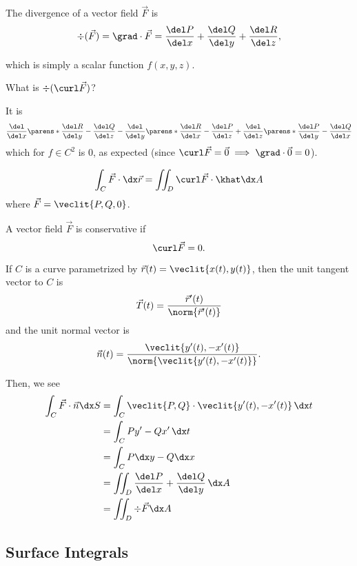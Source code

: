 \documentclass{article}
\begin{document}
\begin{defn}[Divergence]
  The divergence of a vector field $\vec{F}$ is
  \[ \div(\vec{F}) = \grad \cdot \vec{F} = \frac{\del P}{\del x} + \frac{\del Q}{\del y} + \frac{\del R}{\del z}, \]
\end{defn}
which is simply a scalar function $f(x, y, z)$.

\begin{ex}
  What is $\div(\curl \vec{F})$?

  It is
  \[
    \frac{\del}{\del x}\parens*{\frac{\del R}{\del y} - \frac{\del Q}{\del z}}
    - \frac{\del}{\del y}\parens*{\frac{\del R}{\del x} - \frac{\del P}{\del z}}
    + \frac{\del}{\del z}\parens*{\frac{\del P}{\del y} - \frac{\del Q}{\del x}}
  \]
  which for $f \in C^{2}$ is 0, as expected (since $\curl \vec{F} = \vec{0} \implies \grad \cdot \vec{0} = 0$).
\end{ex}

\begin{theorem}
  \[
    \int_{C} \vec{F} \cdot \dx\vec{r} = \iint_{D} \curl \vec{F} \cdot \khat \dx A
  \]
  where $\vec{F} = \veclit{P, Q, 0}$.
\end{theorem}

\begin{defn}[Conservativeness]
  A vector field $\vec{F}$ is conservative if
  \[ \curl \vec{F} = 0. \]
\end{defn}

If $C$ is a curve parametrized by $\vec{r}(t) = \veclit{x(t), y(t)}$, then the unit tangent vector to $C$ is
\[ \vec{T}(t) = \frac{\vec{r}'(t)}{\norm{\vec{r}'(t)}} \]
and the unit normal vector is
\[ \vec{n}(t) = \frac{\veclit{y'(t), -x'(t)}}{\norm{\veclit{y'(t), -x'(t)}}}. \]

Then, we see
\begin{align*}
  \int_{C} \vec{F} \cdot \vec{n} \dx S &= \int_{C} \veclit{P, Q} \cdot \veclit{y'(t), -x'(t)} \, \dx t\\
  &= \int_{C} Py' - Qx' \, \dx t\\
  &= \int_{C} P \dx y - Q \dx x\\
  &= \iint_{D} \frac{\del P}{\del x} + \frac{\del Q}{\del y} \, \dx A\\
  &= \iint_{D} \div{\vec{F}} \dx A
\end{align*}

\subsection*{Surface Integrals}
\end{document}
